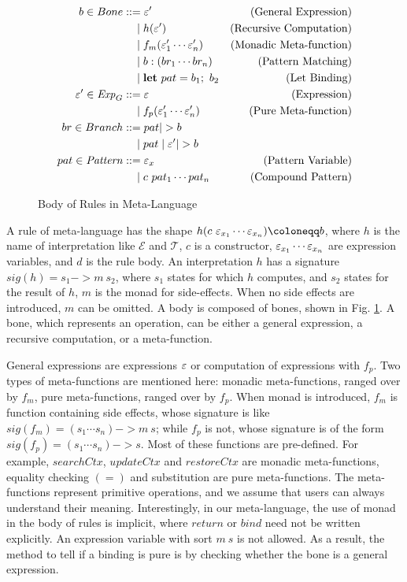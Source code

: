 \begin{figure}
  \begin{align*}
    b \in Bone 
      & ::= \mexp' & \text{(General Expression)} \\
      & \quad \mid h(\mexp') & \text{(Recursive Computation)} \\
      & \quad \mid f_m(\mexp'_1\cdots \mexp'_n) & \text{(Monadic Meta-function)} \\
      & \quad \mid b:(br_1\cdots br_n) & \text{(Pattern Matching)} \\
      & \quad \mid \Let{pat}{b_1} b_2 & \text{(Let Binding)} \\
    \mexp' \in \Exp_G
      & ::= \mexp & \text{(Expression)} \\
      & \quad \mid f_p(\mexp'_1\cdots \mexp'_n) & \text{(Pure Meta-function)} \\
    br \in Branch
      & ::= pat |> b \\
      & \quad \mid pat \mid \mexp' |> b \\
    pat \in \mathit{Pattern}
      & ::= \mexp_x & \text{(Pattern Variable)} \\
      & \quad \mid c~pat_1\cdots pat_n & \text{(Compound Pattern)}
  \end{align*}
\caption{Body of Rules in Meta-Language}
\label{fig:body}
\end{figure}

A rule of meta-language has the shape $h(c~\mexp_{x_1}\cdots \mexp_{x_n}) \cqq b$, 
 where $h$ is the name of interpretation like $\mathcal{E}$ and $\mathcal{T}$,
 $c$ is a constructor, 
 $\varepsilon_{x_1}\cdots \varepsilon_{x_n}$ are expression variables,
 and $d$ is the rule body.
An interpretation $h$ has a signature $sig(h)=s_1->m~s_2$, 
 where $s_1$ states for which $h$ computes,
 and $s_2$ states for the result of $h$,
 $m$ is the monad for side-effects.
When no side effects are introduced, $m$ can be omitted.
A body is composed of bones, shown in Fig. \ref{fig:body}.
A bone, which represents an operation, 
 can be either a general expression, 
 a recursive computation,
 or a meta-function.

General expressions are expressions $\varepsilon$ or computation of expressions with $f_p$.
Two types of meta-functions are mentioned here:
 monadic meta-functions, ranged over by $f_m$,
 pure meta-functions, ranged over by $f_p$.
When monad is introduced,
 $f_m$ is function containing side effects, 
  whose signature is like $sig(f_m)=(s_1\cdots s_n)->m~s$;
 while $f_p$ is not,
  whose signature is of the form $sig(f_p)=(s_1\cdots s_n)->s$.
Most of these functions are pre-defined.
For example, $searchCtx$, $updateCtx$ and $restoreCtx$ are monadic meta-functions,
 equality checking $(=)$ and substitution are pure meta-functions.
The meta-functions represent primitive operations, and we assume that users can always understand their meaning.
Interestingly, in our meta-language, the use of monad in the body of rules is implicit,
 where $return$ or $bind$ need not be written explicitly.
An expression variable with sort $m~s$ is not allowed.
As a result, the method to tell if a binding is pure is by checking whether the bone is a general expression.

